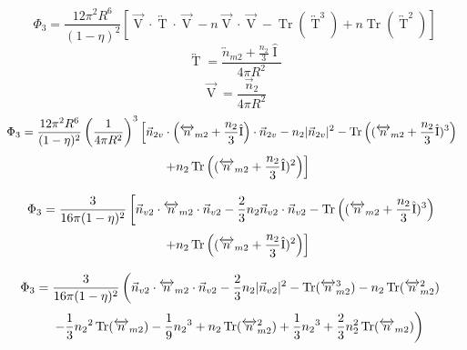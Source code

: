 \documentclass[letterpaper,twocolumn,amsmath,amssymb,prb]{revtex4-1}
\begin{document}
\begin{widetext}
\begin{equation}{\Phi_3=\frac{12\pi^2R^6}{(1-\eta)^2}\left[\overrightarrow{\operatorname{V}}\cdot\overleftrightarrow{\operatorname{T}}\cdot\overrightarrow{\operatorname{V}}-n\overrightarrow{\operatorname{V}}\cdot\overrightarrow{\operatorname{V}}-\operatorname{Tr}\left(\overleftrightarrow{\operatorname{T}}^3\right)+n\operatorname{Tr}\left(\overleftrightarrow{\operatorname{T}}^2\right)\right]}\end{equation}
\[{}\]
\begin{equation}{\overleftrightarrow{\operatorname{T}}=\frac{{\overleftrightarrow{n}_{m2}}+\frac{n_2}{3}\hat{\operatorname{I}}}{4\pi{R}^2}}\end{equation}
\[{}\]
\begin{equation}{\overrightarrow{\operatorname{V}}=\frac{\vec{n}_2}{4\pi{R}^2}}\end{equation}
\[{}\]
\begin{displaymath}{\Phi_3=\frac{12\pi^2R^6}{(1-\eta)^2}\left(\frac{1}{4\pi{R}^2}\right)^3\left[\vec{n}_{2v}\cdot\left({\overleftrightarrow{n}_{m2}}+\frac{n_2}{3}\hat{\operatorname{I}}\right)\cdot\vec{n}_{2v}-n_2|\vec{n}_{2v}|^2-\operatorname{Tr}\left(({\overleftrightarrow{n}_{m2}}+\frac{n_2}{3}\hat{\operatorname{I}})^3\right)\color{white}\right]\color{black}}\end{displaymath}
\begin{equation}{\color{white}\left[\color{black}+n_2\operatorname{Tr}\left(({\overleftrightarrow{n}_{m2}}+\frac{n_2}{3}\hat{\operatorname{I}})^2\right)\right]}\end{equation}
\[{}\]
\begin{displaymath}{\Phi_3=\frac{3}{16\pi(1-\eta)^2}\left[\vec{n}_{v2}\cdot{\overleftrightarrow{n}_{m2}}\cdot{\vec{n}_{v2}}-\frac{2}{3}n_2\vec{n}_{v2}\cdot\vec{n}_{v2}-\operatorname{Tr}\left(({\overleftrightarrow{n}_{m2}}+\frac{n_2}{3}\hat{\operatorname{I}})^3\right)\color{white}\right]\color{black}}\end{displaymath}\begin{equation}{\color{white}\left[\color{black}+n_2\operatorname{Tr}\left((\overleftrightarrow{n}_{m2}+\frac{n_2}{3}\hat{\operatorname{I}})^2\right)\right]}\end{equation}
\[{}\]
\begin{displaymath}{\Phi_3=\frac{3}{16\pi(1-\eta)^2}\left(\vec{n}_{v2}\cdot{\overleftrightarrow{n}_{m2}}\cdot{\vec{n}_{v2}}-\frac{2}{3}n_2|\vec{n}_{v2}|^2-\operatorname{Tr}({\overleftrightarrow{n}_{m2}^3})
-n_2\operatorname{Tr}(\overleftrightarrow{n}_{m2}^2)\color{white}\right)\color{black}}\end{displaymath} \begin{equation}{\color{white}\left(\color{black}-\frac{1}{3}{n_2}^2\operatorname{Tr}(\overleftrightarrow{n}_{m2})-\frac{1}{9}{n_2}^3+n_2\operatorname{Tr}(\overleftrightarrow{n}_{m2}^2)+\frac{1}{3}{n_2}^3+\frac{2}{3}n^2_2\operatorname{Tr}(\overleftrightarrow{n}_{m2})\right)}\end{equation} 

\end{widetext}
\end{document}
